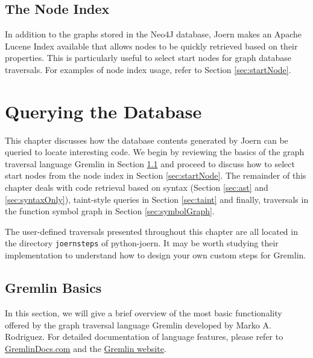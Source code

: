 \documentclass[a4paper]{article}
\newcommand{\code}[1]{\texttt{\small #1}}
\begin{document}
\subsection{The Node Index}

In addition to the graphs stored in the Neo4J database, Joern makes an
Apache Lucene Index available that allows nodes to be quickly
retrieved based on their properties. This is particularly useful to
select start nodes for graph database traversals. For examples of node
index usage, refer to Section \ref{sec:startNode}.

\section{Querying the Database}
\label{sec:examples}

This chapter discusses how the database contents generated by Joern
can be queried to locate interesting code. We begin by reviewing the
basics of the graph traversal language Gremlin in Section
\ref{sec:gremlin} and proceed to discuss how to select start nodes
from the node index in Section \ref{sec:startNode}. The remainder of
this chapter deals with code retrieval based on syntax (Section
\ref{sec:ast} and \ref{sec:syntaxOnly}), taint-style queries in
Section \ref{sec:taint} and finally, traversals in the function symbol
graph in Section \ref{sec:symbolGraph}.

The user-defined traversals presented throughout this chapter are all
located in the directory \code{joernsteps} of python-joern. It may be
worth studying their implementation to understand how to design your
own custom steps for Gremlin.

\subsection{Gremlin Basics}
\label{sec:gremlin}

In this section, we will give a brief overview of the most basic
functionality offered by the graph traversal language Gremlin
developed by Marko A. Rodriguez. For detailed documentation of
language features, please refer to
\href{http://gremlindocs.com}{GremlinDocs.com} and the
\href{https://github.com/tinkerpop/gremlin/wiki}{Gremlin website}.

\end{document}
